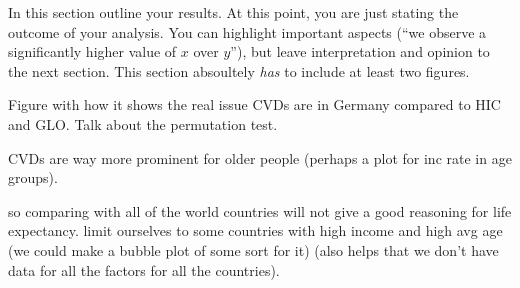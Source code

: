In this section outline your results. At this point, you are just stating the outcome of your analysis. You can highlight important aspects (``we observe a significantly higher value of $x$ over $y$''), but leave interpretation and opinion to the next section. This section absoultely \emph{has} to include at least two figures.



Figure \citep{GBD2019} with how it shows the real issue CVDs are in Germany compared to HIC and GLO. Talk about the permutation test. 

CVDs are way more prominent for older people (perhaps a plot for inc rate in age groups). 

so comparing with all of the world countries will not give a good reasoning for life expectancy. limit ourselves to some countries with high income and high avg age (we could make a bubble plot of some sort for it) (also helps that we don't have data for all the factors for all the countries).

